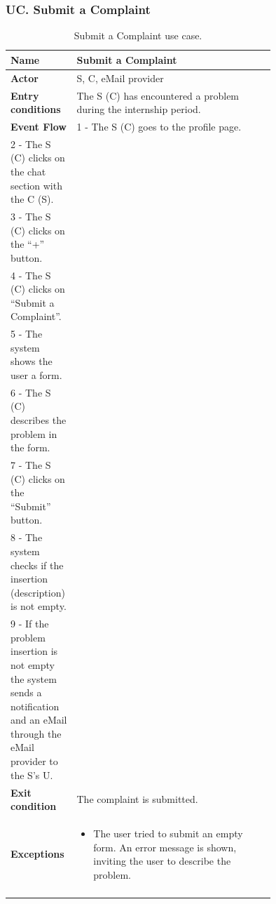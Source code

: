 \subsubsection*{UC\cuc . Submit a Complaint}
\begin{center}
    \begin{longtable}{|l|p{0.75\linewidth}|}
        \hline
        \textbf{Name}               & Submit a Complaint\\
        \hline
        \textbf{Actor}              & S, C, eMail provider\\
        \hline
        \textbf{Entry conditions}   & The S (C) has encountered a problem during the internship period.\\
        \hline
        \textbf{Event Flow}         & 
        1 - The S (C) goes to the profile page. \\
        2 - The S (C) clicks on the chat section with the C (S). \\
        3 - The S (C) clicks on the “+” button. \\
        4 - The S (C) clicks on “Submit a Complaint”. \\
        5 - The system shows the user a form. \\
        6 - The S (C) describes the problem in the form. \\
        7 - The S (C) clicks on the “Submit” button. \\
        8 - The system checks if the insertion (description) is not empty. \\
        9 - If the problem insertion is not empty the system sends a notification and an eMail through the eMail provider to the S’s U. \\
        \hline
        \textbf{Exit condition}   & The complaint is submitted. \\       
        \hline
        \textbf{Exceptions}       & \begin{itemize}
            \item The user tried to submit an empty form. An error message is shown, inviting the user to describe the problem.
        \end{itemize}\\
        \hline
        \caption{Submit a Complaint use case.}
        \label{tab: submit_a_complaint_use_case}
    \end{longtable}
\end{center}


